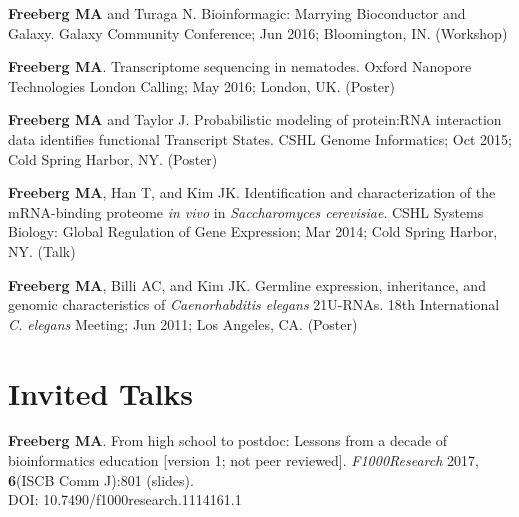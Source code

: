 \documentclass[margin,line]{res}
\begin{document}
\begin{resume}

{ \bf Freeberg MA} and Turaga N. Bioinformagic: Marrying Bioconductor and Galaxy. Galaxy Community Conference; Jun 2016; Bloomington, IN. (Workshop)

{\bf Freeberg MA}. Transcriptome sequencing in nematodes. Oxford Nanopore Technologies London Calling; May 2016; London, UK. (Poster)

{ \bf Freeberg MA} and Taylor J. Probabilistic modeling of protein:RNA interaction data identifies functional Transcript States. CSHL Genome Informatics; Oct 2015; Cold Spring Harbor, NY. (Poster)

{ \bf Freeberg MA}, Han T, and Kim JK. Identification and characterization of the mRNA-binding proteome {\em in vivo} in {\em Saccharomyces cerevisiae}. CSHL Systems Biology: Global Regulation of Gene Expression; Mar 2014; Cold Spring Harbor, NY. (Talk)


{\bf Freeberg MA}, Billi AC, and Kim JK. Germline expression, inheritance, and genomic characteristics of {\em Caenorhabditis elegans} 21U-RNAs. 18th International {\em C. elegans} Meeting; Jun 2011; Los Angeles, CA. (Poster)




\section{\sc Invited Talks}
{\bf Freeberg MA}. From high school to postdoc: Lessons from a decade of bioinformatics education [version 1; not peer reviewed]. {\em F1000Research} 2017, {\bf 6}(ISCB Comm J):801 (slides).\\ DOI: 10.7490/f1000research.1114161.1


\end{resume}
\end{document}
